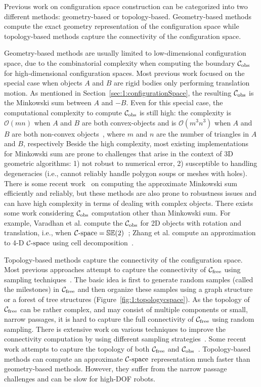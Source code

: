 Previous work on configuration space construction can be categorized into two different methods: geometry-based or topology-based. Geometry-based methods compute the exact geometry representation of the configuration space while topology-based methods capture the connectivity of the configuration space.

Geometry-based methods are usually limited to low-dimensional configuration space, due to the combinatorial complexity when computing the boundary $\mathcal C_{\text{obs}}$ for high-dimensional configuration spaces. Most previous work focused on the special case when objects $A$ and $B$ are rigid bodies only performing translation motion. As mentioned in Section~\ref{sec:1:configurationSpace}, the resulting $\mathcal C_{\text{obs}}$ is the Minkowski sum between $A$ and $-B$. Even for this special case, the computational complexity to compute $\mathcal C_{\text{obs}}$ is still high: the complexity is $\mathcal O(mn)$ when $A$ and $B$ are both convex-objects and is $\mathcal O(m^3n^3)$ when $A$ and $B$ are both non-convex objects~\cite{Halperin:2002:RGC}, where $m$ and $n$ are the number of triangles in $A$ and $B$, respectively Beside the high complexity, most existing implementations for Minkowski sum are prone to challenges that arise in the context of 3D geometric algorithms: 1) not robust to numerical error, 2) susceptible to handling degeneracies (i.e., cannot reliably handle polygon soups or meshes with holes). There is some recent work~\cite{Lien:2008:CMS,Lien:2007:ACD,Lien:2009:ASM} on computing the approximate Minkowski sum efficiently and reliably, but these methods are also prone to robustness issues and can have high complexity in terms of dealing with complex objects. There exists some work considering $\mathcal C_{\text{obs}}$ computation other than Minkowski sum. For example, Varadhan et al. compute the $\mathcal C_{\text{obs}}$ for 2D objects with rotation and translation, i.e., when $\mathcal C\text{-space} = \mathbb {SE}(2)$~\cite{Varadhan:2006:TPA}; Zhang et al. compute an approximation to 4-D $\mathcal C\text{-space}$ using cell decomposition~\cite{Zhang:2007:IROS}.

Topology-based methods capture the connectivity of the configuration space. Most previous approaches attempt to capture the connectivity of $\mathcal C_{\text{free}}$ using sampling techniques~\cite{Kavraki96,Kuffner00}. The basic idea is first to generate random samples (called the milestones) in $\mathcal C_{\text{free}}$ and then organize these samples using a graph structure or a forest of tree structures (Figure~\ref{fig:1:topologycspace}). As the topology of $\mathcal C_{\text{free}}$ can be rather complex, and
may consist of multiple components or small, narrow passages, it is hard to capture the full connectivity of $\mathcal C_{\text{free}}$ using random sampling. There is extensive work on various techniques to improve the connectivity computation by using different sampling strategies~\cite{Amato:1998:OOP,Boor:1999:ICRA,Hsu:1998:FNP,Rodriguez:2006,Zhang:2008:ICRA,Zheng:2005}. Some recent work attempts to capture the topology of both $\mathcal C_{\text{free}}$ and $\mathcal C_{\text{obs}}$~\cite{Jory:2011:IROS}. Topology-based methods can compute an approximate $\mathcal C\text{-space}$ representation much faster than geometry-based methods. However, they suffer from the narrow passage challenges and can be slow for high-DOF robots.


